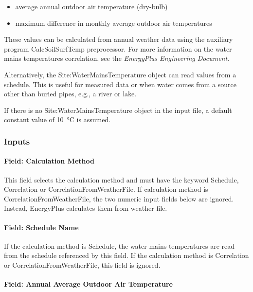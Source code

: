 \begin{itemize}
\item
  average annual outdoor air temperature (dry-bulb)
\item
  maximum difference in monthly average outdoor air temperatures
\end{itemize}

These values can be calculated from annual weather data using the auxiliary program CalcSoilSurfTemp preprocessor. For more information on the water mains temperatures correlation, see the \emph{EnergyPlus Engineering Document}.

Alternatively, the Site:WaterMainsTemperature object can read values from a schedule. This is useful for measured data or when water comes from a source other than buried pipes, e.g., a river or lake.

If there is no Site:WaterMainsTemperature object in the input file, a default constant value of \SI{10}{\degreeCelsius} is assumed.

\subsubsection{Inputs}\label{inputs-21-003}

\paragraph{Field: Calculation Method}\label{field-calculation-method}

This field selects the calculation method and must have the keyword Schedule, Correlation or CorrelationFromWeatherFile. If calculation method is CorrelationFromWeatherFile, the two numeric input fields below are ignored. Instead, EnergyPlus calculates them from weather file.

\paragraph{Field: Schedule Name}\label{field-schedule-name-003}

If the calculation method is Schedule, the water mains temperatures are read from the schedule referenced by this field. If the calculation method is Correlation or CorrelationFromWeatherFile, this field is ignored.

\paragraph{Field: Annual Average Outdoor Air Temperature}\label{field-annual-average-outdoor-air-temperature}

